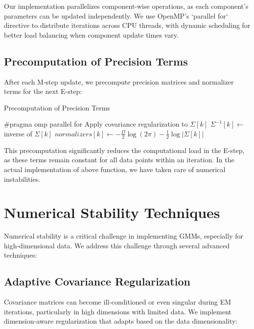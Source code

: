 \documentclass[conference]{IEEEtran}
\begin{document}
Our implementation parallelizes component-wise operations, as each component's parameters can be updated independently. We use OpenMP's `parallel for` directive to distribute iterations across CPU threads, with dynamic scheduling for better load balancing when component update times vary. 


\subsection{Precomputation of Precision Terms}

After each M-step update, we precompute precision matrices and normalizer terms for the next E-step:

\begin{algorithm}
\caption{Precomputation of Precision Terms}
\begin{algorithmic}[1]
\STATE \#pragma omp parallel for
    \STATE Apply covariance regularization to $\Sigma[k]$
    \STATE $\Sigma^{-1}[k] \gets$ inverse of $\Sigma[k]$
    \STATE $normalizers[k] \gets -\frac{D}{2}\log(2\pi) - \frac{1}{2}\log|\Sigma[k]|$
\ENDFOR
\end{algorithmic}
\end{algorithm}

This precomputation significantly reduces the computational load in the E-step, as these terms remain constant for all data points within an iteration. In the actual implementation of above function, we have taken care of numerical instabilities.

\section{Numerical Stability Techniques}
\label{numerical_stability}

Numerical stability is a critical challenge in implementing GMMs, especially for high-dimensional data. We address this challenge through several advanced techniques:

\subsection{Adaptive Covariance Regularization}

Covariance matrices can become ill-conditioned or even singular during EM iterations, particularly in high dimensions with limited data. We implement dimension-aware regularization that adapts based on the data dimensionality:
\end{document}
